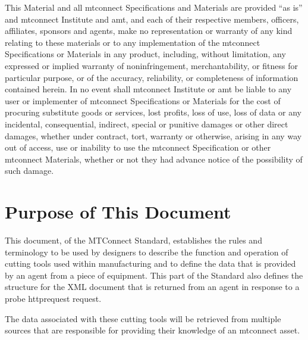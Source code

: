 \documentclass{mtconnect}	%
\begin{document}
\begin{nolinenumbers}
This Material and all \gls{mtconnect} Specifications and Materials are provided ``as is'' and \gls{mtconnect} Institute and \gls{amt}, and each of their respective members, officers, affiliates, sponsors and agents, make no representation or warranty of any kind relating to these materials or to any implementation of the \gls{mtconnect} Specifications or Materials in any product, including, without limitation, any expressed or implied warranty of noninfringement, merchantability, or fitness for particular purpose, or of the accuracy, reliability, or completeness of information contained herein. In no event shall \gls{mtconnect} Institute or \gls{amt} be liable to any user or implementer of \gls{mtconnect} Specifications or Materials for the cost of procuring substitute goods or services, lost profits, loss of use, loss of data or any incidental, consequential, indirect, special or punitive damages or other direct damages, whether under contract, tort, warranty or otherwise, arising in any way out of access, use or inability to use the \gls{mtconnect} Specification or other \gls{mtconnect} Materials, whether or not they had advance notice of the possibility of such damage.


\clearpage
\tableofcontents
\thispagestyle{fancy}
\clearpage
\listoffigures
\thispagestyle{fancy}
\clearpage
\listoftables
\end{nolinenumbers}



\section{Purpose of This Document}

This document,  of the MTConnect Standard, establishes the rules and terminology to be used by designers to describe the function and operation of cutting tools used within manufacturing and to define the data that is provided by an \gls{agent} from a piece of equipment.  This part of the Standard also defines the structure for the XML document that is returned from an \gls{agent} in response to a \gls{probe httprequest} request. 

The data associated with these cutting tools will be retrieved from multiple sources that are responsible for providing their knowledge of an \gls{mtconnect asset}.
\end{document}
